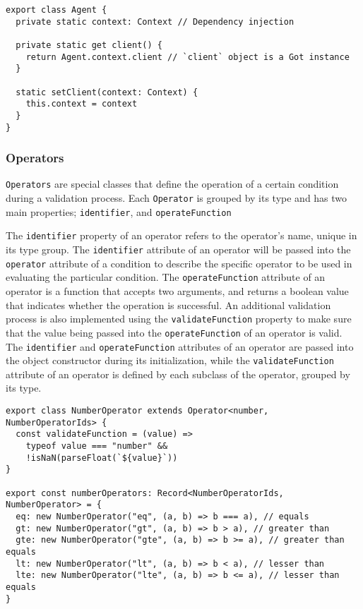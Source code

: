       \begin{lstlisting}[style=es6, caption={Usage of the singleton pattern and dependency injection in Agent class (TypeScript)}]
export class Agent {
  private static context: Context // Dependency injection

  private static get client() {
    return Agent.context.client // `client` object is a Got instance
  }

  static setClient(context: Context) {
    this.context = context
  }
}
\end{lstlisting}

    \subsubsection{Operators}
      \label{impl_cl:op}

      \verb;Operators; are special classes that define the operation of a certain condition during a validation process. Each \verb;Operator; is grouped by its type and has two main properties; \verb;identifier;, and \verb;operateFunction;
      
      The \verb;identifier; property of an operator refers to the operator's name, unique in its type group. The \verb;identifier; attribute of an operator will be passed into the \verb;operator; attribute of a condition to describe the specific operator to be used in evaluating the particular condition. The \verb;operateFunction; attribute of an operator is a function that accepts two arguments, and returns a boolean value that indicates whether the operation is successful. An additional validation process is also implemented using the \verb;validateFunction; property to make sure that the value being passed into the \verb;operateFunction; of an operator is valid. The \verb;identifier; and \verb;operateFunction; attributes of an operator are passed into the object constructor during its initialization, while the \verb;validateFunction; attribute of an operator is defined by each subclass of the operator, grouped by its type.  
      
      \newpage
      \begin{lstlisting}[style=es6, caption={NumberOperator example (TypeScript)}]
export class NumberOperator extends Operator<number, NumberOperatorIds> {
  const validateFunction = (value) =>
    typeof value === "number" &&
    !isNaN(parseFloat(`${value}`))
}

export const numberOperators: Record<NumberOperatorIds, NumberOperator> = {
  eq: new NumberOperator("eq", (a, b) => b === a), // equals
  gt: new NumberOperator("gt", (a, b) => b > a), // greater than
  gte: new NumberOperator("gte", (a, b) => b >= a), // greater than equals
  lt: new NumberOperator("lt", (a, b) => b < a), // lesser than
  lte: new NumberOperator("lte", (a, b) => b <= a), // lesser than equals
} 
\end{lstlisting}

